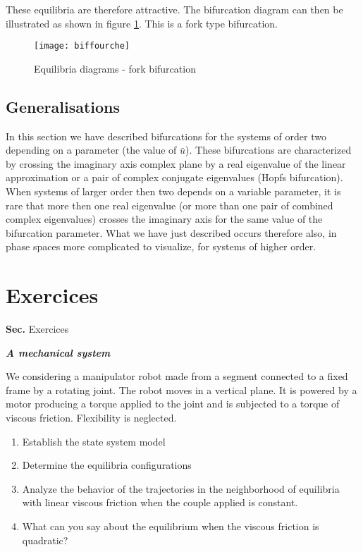 {These equilibria are therefore attractive. The bifurcation diagram can then
be illustrated as shown in figure \ref{fig:biffourche}. This is a fork type bifurcation.

\begin{figure}[htbp] 
   \centering
   \texttt{[image: biffourche]} 
   \caption{Equilibria diagrams - fork bifurcation}
   \label{fig:biffourche}
\end{figure}
 
\subsection{Generalisations}

In this section we have described bifurcations
for the systems of order two depending on a parameter (the value of $\bar u$). 
These bifurcations are characterized by crossing the imaginary axis
complex plane by a real eigenvalue of the linear approximation or a
pair of complex conjugate eigenvalues (Hopfs bifurcation). When
systems of larger order then two depends on a variable parameter, it is rare
that more then one real eigenvalue (or more than one pair of combined complex eigenvalues) 
crosses the imaginary axis for the same value of the bifurcation parameter. 
What we have just described occurs therefore also, in phase spaces
more complicated to visualize, for systems of higher order.

\newpage
\section{Exercices}
{{\bf Sec. \thesection}\hfill Exercices
\hspace*{5mm}}
 
\begin{exercice} {\bf \em A mechanical system}

We considering a manipulator robot made from a segment connected to a fixed frame by a rotating joint. 
The robot moves in a vertical plane. It is powered by a motor producing a torque
applied to the joint and is subjected to a torque of viscous friction. Flexibility is neglected.

\begin{enumerate}
\item Establish the state system model
\item Determine the equilibria configurations
\item Analyze the behavior of the trajectories in the neighborhood of
equilibria with linear viscous friction when the couple
applied is constant.
\item What can you say about the equilibrium when the viscous friction
is quadratic?
\end{enumerate}
\end{exercice}
\vv

}

